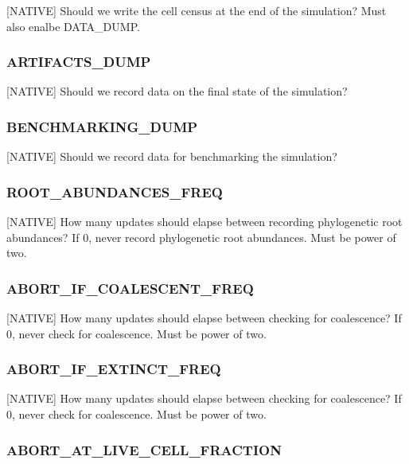
[NATIVE] Should we write the cell census at the end of the simulation? Must also enalbe DATA_DUMP.

\subsubsection{ARTIFACTS\_DUMP}


[NATIVE] Should we record data on the final state of the simulation?

\subsubsection{BENCHMARKING\_DUMP}


[NATIVE] Should we record data for benchmarking the simulation?

\subsubsection{ROOT\_ABUNDANCES\_FREQ}


[NATIVE] How many updates should elapse between recording phylogenetic root abundances? If 0, never record phylogenetic root abundances. Must be power of two.

\subsubsection{ABORT\_IF\_COALESCENT\_FREQ}


[NATIVE] How many updates should elapse between checking for coalescence? If 0, never check for coalescence. Must be power of two.

\subsubsection{ABORT\_IF\_EXTINCT\_FREQ}


[NATIVE] How many updates should elapse between checking for coalescence? If 0, never check for coalescence. Must be power of two.

\subsubsection{ABORT\_AT\_LIVE\_CELL\_FRACTION}

